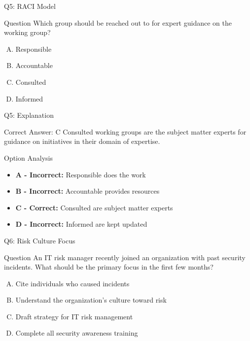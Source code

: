 \documentclass{beamer}
\begin{document}
	\begin{frame}{Q5: RACI Model}
		\begin{block}{Question}
			Which group should be reached out to for expert guidance on the working group?
		\end{block}
		\begin{enumerate}[(A)]
			\item Responsible
			\item Accountable
			\item Consulted
			\item Informed
		\end{enumerate}
	\end{frame}
	
	\begin{frame}{Q5: Explanation}
		\begin{block}{Correct Answer: C}
			Consulted working groups are the subject matter experts for guidance on initiatives in their domain of expertise.
		\end{block}
		\begin{block}{Option Analysis}
			\begin{itemize}
				\item \textbf{A - Incorrect:} Responsible does the work
				\item \textbf{B - Incorrect:} Accountable provides resources
				\item \textbf{C - Correct:} Consulted are subject matter experts
				\item \textbf{D - Incorrect:} Informed are kept updated
			\end{itemize}
		\end{block}
	\end{frame}
	
	\begin{frame}{Q6: Risk Culture Focus}
		\begin{block}{Question}
			An IT risk manager recently joined an organization with past security incidents. What should be the primary focus in the first few months?
		\end{block}
		\begin{enumerate}[(A)]
			\item Cite individuals who caused incidents
			\item Understand the organization's culture toward risk
			\item Draft strategy for IT risk management
			\item Complete all security awareness training
		\end{enumerate}
	\end{frame}
	
\end{document}
